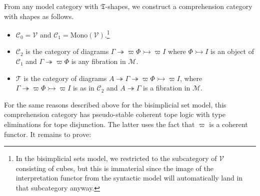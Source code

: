 \documentclass{amsart}
\theoremstyle{plain}
\theoremstyle{definition}
\theoremstyle{remark}
\numberwithin{equation}{section}
\newcommand{\C}{\mathcal{C}}
\newcommand{\T}{\mathcal{T}}
\newcommand{\M}{\mathcal{M}}
\newcommand{\V}{\mathcal{V}}
\newcommand{\fT}{\mathfrak{T}}
\begin{document}
From any model category with $\fT$-shapes, we construct a comprehension category with shapes as follows.
\begin{itemize}
\item $\C_0 = \V$ and $\C_1 = \mathrm{Mono}(\V)$.\footnote{In the bisimplicial sets model, we restricted to the subcategory of $\V$ consisting of cubes, but this is immaterial since the image of the interpretation functor from the syntactic model will automatically land in that subcategory anyway.}
\item $\C_2$ is the category of diagrams $\Gamma \twoheadrightarrow \varpi\Phi\rightarrowtail \varpi I$ where $\Phi\rightarrowtail I$ is an object of $\C_1$ and $\Gamma\twoheadrightarrow \varpi\Phi$ is any fibration in $\M$.
\item $\T$ is the category of diagrams $A \twoheadrightarrow \Gamma \twoheadrightarrow \varpi\Phi\rightarrowtail \varpi I$, where $\Gamma \twoheadrightarrow \varpi\Phi\rightarrowtail \varpi I$ is as in $\C_2$ and $A \twoheadrightarrow \Gamma$ is a fibration in $\M$.
\end{itemize}
For the same reasons described above for the bisimplicial set model, this comprehension category has pseudo-stable coherent tope logic with type eliminations for tope disjunction.
The latter uses the fact that $\varpi$ is a coherent functor.
It remains to prove:
\end{document}
